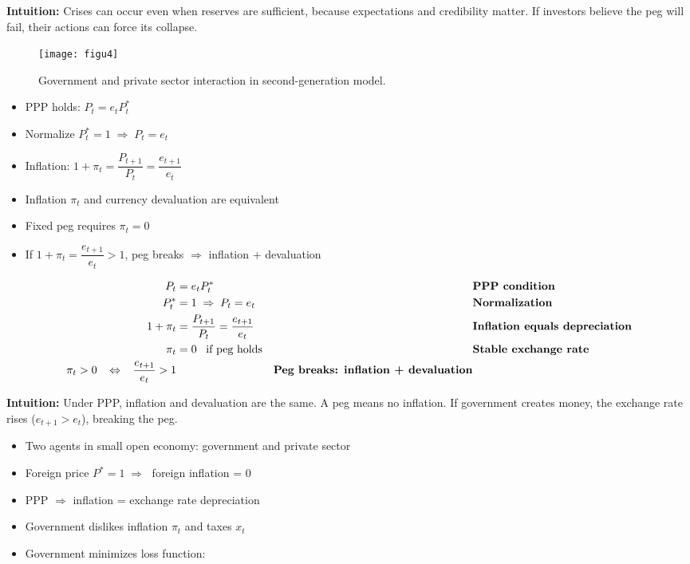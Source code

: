 \documentclass[12pt]{article}
\begin{document}
\textbf{Intuition:} Crises can occur even when reserves are sufficient, because expectations and credibility matter. If investors believe the peg will fail, their actions can force its collapse.

\begin{figure}[H]
    \centering
    \texttt{[image: figu4]}
    \caption{Government and private sector interaction in second-generation model.}
\end{figure}

\begin{itemize}
    \item PPP holds: $P_t = e_t P_t^*$
    \item Normalize $P_t^* = 1 \;\Rightarrow\; P_t = e_t$
    \item Inflation: $1 + \pi_t = \dfrac{P_{t+1}}{P_t} = \dfrac{e_{t+1}}{e_t}$
    \item Inflation $\pi_t$ and currency devaluation are equivalent
    \item Fixed peg requires $\pi_t = 0$
    \item If $1 + \pi_t = \dfrac{e_{t+1}}{e_t} > 1$, peg breaks $\Rightarrow$ inflation + devaluation
\end{itemize}

\singlespacing
\begin{align}
P_t &= e_t P_t^* && \text{\textbf{PPP condition}}\\
P_t^* &= 1 \;\Rightarrow\; P_t = e_t && \text{\textbf{Normalization}}\\
1 + \pi_t &= \frac{P_{t+1}}{P_t} = \frac{e_{t+1}}{e_t} && \text{\textbf{Inflation equals depreciation}}\\
\pi_t &= 0 \;\;\; \text{if peg holds} && \text{\textbf{Stable exchange rate}}\\
\pi_t > 0 \;\;\; \Leftrightarrow \;\;\; \frac{e_{t+1}}{e_t} > 1 && \text{\textbf{Peg breaks: inflation + devaluation}}
\end{align}

\textbf{Intuition:} Under PPP, inflation and devaluation are the same. A peg means no inflation. If government creates money, the exchange rate rises ($e_{t+1} > e_t$), breaking the peg.

\begin{itemize}
    \item Two agents in small open economy: government and private sector
    \item Foreign price $P^* = 1 \;\Rightarrow\;$ foreign inflation = 0
    \item PPP $\Rightarrow$ inflation = exchange rate depreciation
    \item Government dislikes inflation $\pi_t$ and taxes $x_t$
    \item Government minimizes loss function:
\end{itemize}
\end{document}

